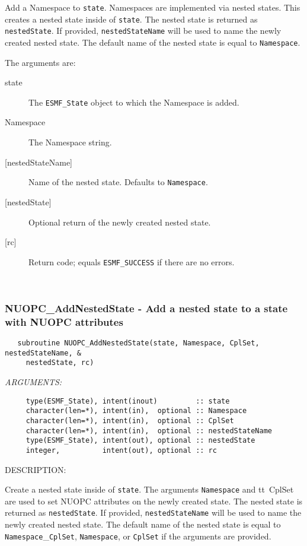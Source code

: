      Add a Namespace to {\tt state}. Namespaces are implemented via nested 
     states. This creates a nested state inside of {\tt state}. The nested state
     is returned as {\tt nestedState}. If provided, {\tt nestedStateName} will 
     be used to name the newly created nested state. The default name of the 
     nested state is equal to {\tt Namespace}.
  
     The arguments are:
     \begin{description}
     \item[state]
       The {\tt ESMF\_State} object to which the Namespace is added.
     \item[Namespace]
       The Namespace string.
     \item[{[nestedStateName]}]
       Name of the nested state. Defaults to {\tt Namespace}.
     \item[{[nestedState]}]
       Optional return of the newly created nested state.
     \item[{[rc]}]
       Return code; equals {\tt ESMF\_SUCCESS} if there are no errors.
     \end{description}
   
 
\mbox{}\hrulefill\ 
 
\subsubsection [NUOPC\_AddNestedState] {NUOPC\_AddNestedState - Add a nested state to a state with NUOPC attributes}


\begin{verbatim}   subroutine NUOPC_AddNestedState(state, Namespace, CplSet, nestedStateName, &
     nestedState, rc)\end{verbatim}{\em ARGUMENTS:}
\begin{verbatim}     type(ESMF_State), intent(inout)         :: state
     character(len=*), intent(in),  optional :: Namespace
     character(len=*), intent(in),  optional :: CplSet
     character(len=*), intent(in),  optional :: nestedStateName
     type(ESMF_State), intent(out), optional :: nestedState
     integer,          intent(out), optional :: rc\end{verbatim}
{\sf DESCRIPTION:\\ }


     Create a nested state inside of {\tt state}. The arguments {\tt Namespace}
     and {tt\ CplSet} are used to set NUOPC attributes on the newly created
     state. The nested state is returned as {\tt nestedState}. If provided,
     {\tt nestedStateName} will be used to name the newly created nested state.
     The default name of the nested state is equal to
     {\tt Namespace}\_{\tt CplSet}, {\tt Namespace}, or {\tt CplSet} if the
     arguments are provided.
  
